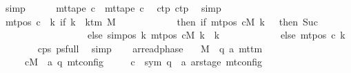 \begin{isabellebody}
\ simp\isanewline
\ \ \ \ \isamarkupfalse%
\ {\isachardoublequoteopen}mt{\isacharunderscore}{\kern0pt}tape\ c{}\ {\isacharequal}{\kern0pt}\ mt{\isacharunderscore}{\kern0pt}tape\ c{}{\isachardoublequoteclose}\ \isamarkupfalse%
\ c{}{\isacharunderscore}{\kern0pt}tp\ c{}{\isacharunderscore}{\kern0pt}tp\ \isamarkupfalse%
\ simp\isanewline
\ \ \ \ \isamarkupfalse%
\ {\isachardoublequoteopen}mt{\isacharunderscore}{\kern0pt}pos\ c{}\ {\isacharequal}{\kern0pt}\ {\isacharparenleft}{\kern0pt}{\isasymlambda}k{\isachardot}{\kern0pt}\ if\ k\ {\isacharless}{\kern0pt}\ k{\isacharunderscore}{\kern0pt}tm\ M\isanewline
\ \ \ \ \ \ \ \ \ \ \ \ then\ {\isacharparenleft}{\kern0pt}if\ mt{\isacharunderscore}{\kern0pt}pos\ cM\ k\ {\isacharequal}{\kern0pt}\ {}\ then\ Suc\ {}\isanewline
\ \ \ \ \ \ \ \ \ \ \ \ \ \ \ \ \ \ else\ sim{\isacharunderscore}{\kern0pt}pos\ {\isacharquery}{\kern0pt}k\ {\isacharparenleft}{\kern0pt}mt{\isacharunderscore}{\kern0pt}pos\ cM\ k{\isacharparenright}{\kern0pt}\ {\isacharplus}{\kern0pt}\ {\isacharquery}{\kern0pt}k{\isacharparenright}{\kern0pt}\isanewline
\ \ \ \ \ \ \ \ \ \ \ \ else\ mt{\isacharunderscore}{\kern0pt}pos\ c{}\ k{\isacharparenright}{\kern0pt}{\isachardoublequoteclose}\isanewline
\ \ \ \ \ \ \isamarkupfalse%
\ c{}{\isacharunderscore}{\kern0pt}ps\ ps{\isacharunderscore}{\kern0pt}full\ \isamarkupfalse%
\ simp\isanewline
\ \ \isamarkupfalse%
\isanewline
{}\isamarkupfalse%
%
\endisatagproof
{\isafoldproof}%
%
\isadelimproof
\isanewline
%
\endisadelimproof
\isanewline
{}\isamarkupfalse%
\ ar{\isacharunderscore}{\kern0pt}read{\isacharunderscore}{\kern0pt}phase{\isacharcolon}{\kern0pt}\isanewline
\ \ \ M\ {\isacharcolon}{\kern0pt}{\isacharcolon}{\kern0pt}\ {\isachardoublequoteopen}{\isacharparenleft}{\kern0pt}{\isacharprime}{\kern0pt}q{\isacharcomma}{\kern0pt}\ {\isacharprime}{\kern0pt}a{\isacharparenright}{\kern0pt}\ mttm{\isachardoublequoteclose}\isanewline
\ \ \ \ \ cM\ {\isacharcolon}{\kern0pt}{\isacharcolon}{\kern0pt}\ {\isachardoublequoteopen}{\isacharparenleft}{\kern0pt}{\isacharprime}{\kern0pt}a{\isacharcomma}{\kern0pt}\ {\isacharprime}{\kern0pt}q{\isacharparenright}{\kern0pt}\ mt{\isacharunderscore}{\kern0pt}config{\isachardoublequoteclose}\isanewline
\ \ \ \ \ c{}\ {\isacharcolon}{\kern0pt}{\isacharcolon}{\kern0pt}\ {\isachardoublequoteopen}{\isacharparenleft}{\kern0pt}sym{}{\isacharcomma}{\kern0pt}\ {\isacharprime}{\kern0pt}q\ {\isasymtimes}\ {\isacharprime}{\kern0pt}a\ ar{\isacharunderscore}{\kern0pt}stage{\isacharparenright}{\kern0pt}\ mt{\isacharunderscore}{\kern0pt}config{\isachardoublequoteclose}\isanewline

\end{isabellebody}
